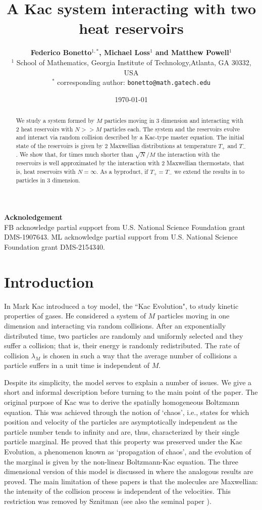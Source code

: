 \documentclass{article}
\title{\bf \huge A Kac system interacting with two heat reservoirs}
\author{{\bf Federico Bonetto$^{1,*}$, Michael Loss$^1$ and Matthew Powell$^1$}\\
\small $^1$ School of Mathematics, Georgia Institute of Technology,Atlanta, GA 30332, USA\\
\small $^*$ corresponding author: \tt bonetto@math.gatech.edu}
\date{\today}
\begin{document}
\maketitle

\begin{abstract}
 We study a system formed by $M$ particles moving in 3 dimension and interacting with 2 heat reservoirs with $N>>M$
particles each. The system and the reservoirs evolve and interact via random collision described by a Kac-type master
equation. The initial state of the reservoirs is given by 2 Maxwellian distributions at temperature $T_+$ and $T_-$. We
show that, for times much shorter than $\sqrt{N}/M$ the interaction with the reservoirs is well approximated by the
interaction with 2 Maxwellian thermostats, that is, heat reservoirs with $N=\infty$. As a byproduct, if $T_+=T_-$ we
extend the results in \cite{BLTV} to particles in 3 dimension.
\end{abstract}

\begin{center} {\bf Acknoledgement}\\
	FB acknowledge partial support from U.S. National Science Foundation grant DMS-1907643. ML acknowledge partial 
	support from U.S. National Science Foundation grant DMS-2154340.
\end{center}

\section{Introduction}

In \cite{Kac} Mark Kac introduced a toy model, the ``Kac Evolution",  to study kinetic properties of gases. He
considered a system of $M$ particles moving in one dimension and interacting via random collisions. After an
exponentially distributed time, two particles are randomly and uniformly selected and they suffer a collision; that is,
their energy is randomly redistributed. The rate of collision $\lambda_M$ is chosen in such a way that the average
number of collisions a particle suffers in a unit time is independent of $M$.

Despite its simplicity, the model serves to explain a number of issues. We give a short and informal description before
turning to the main point of the paper. The original purpose of Kac was to derive the spatially homogeneous Boltzmann
equation. This was achieved through the notion of `chaos', i.e., states for which position and velocity of the particles
are asymptotically independent as the particle number tends to infinity and are, thus, characterized by their single
particle marginal. He proved that this property was preserved under the Kac Evolution, a phenomenon known as
`propagation of chaos', and the evolution of the marginal is given by the non-linear Boltzmann-Kac equation. The three
dimensional version of this model is discussed in \cite{KacBook} where the analogous results are proved. The main
limitation of these papers is that the molecules are Maxwellian:  the intensity of the collision process is independent
of the velocities.  This restriction was removed by Sznitman \cite{Sznitman84} (see also the seminal paper
\cite{MischlerMouhot1}).
\end{document}
